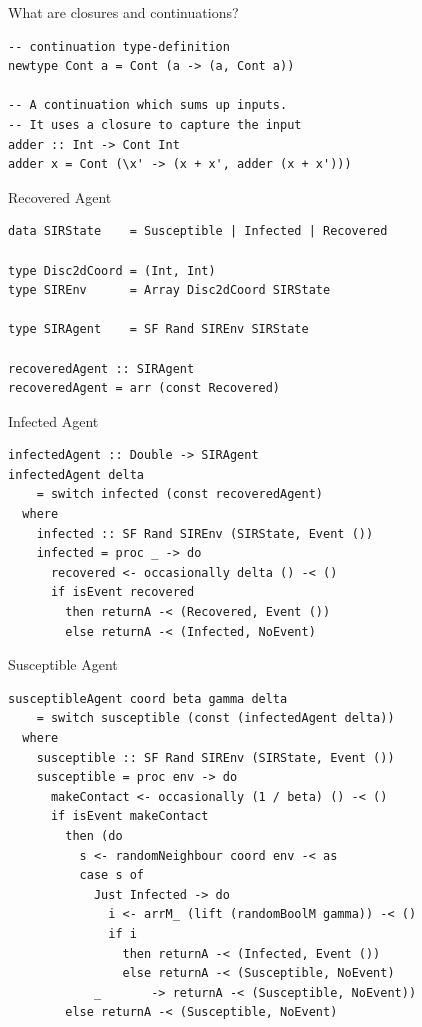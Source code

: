 \documentclass{beamer} %
\begin{document}
\begin{frame}[fragile]{What are closures and continuations?}
\begin{block}{}
\begin{verbatim}
-- continuation type-definition
newtype Cont a = Cont (a -> (a, Cont a))

-- A continuation which sums up inputs.
-- It uses a closure to capture the input
adder :: Int -> Cont Int
adder x = Cont (\x' -> (x + x', adder (x + x')))
\end{verbatim}
\end{block}
\end{frame}

\begin{frame}[fragile]{Recovered Agent}
\begin{block}{}
\begin{verbatim}
data SIRState    = Susceptible | Infected | Recovered

type Disc2dCoord = (Int, Int)
type SIREnv      = Array Disc2dCoord SIRState

type SIRAgent    = SF Rand SIREnv SIRState

recoveredAgent :: SIRAgent
recoveredAgent = arr (const Recovered) 
\end{verbatim}
\end{block}
\end{frame}

\begin{frame}[fragile]{Infected Agent}
\begin{block}{}
\begin{verbatim}
infectedAgent :: Double -> SIRAgent
infectedAgent delta
    = switch infected (const recoveredAgent)
  where
    infected :: SF Rand SIREnv (SIRState, Event ())
    infected = proc _ -> do
      recovered <- occasionally delta () -< ()
      if isEvent recovered
        then returnA -< (Recovered, Event ())
        else returnA -< (Infected, NoEvent)
\end{verbatim}
\end{block}
\end{frame}

\begin{frame}[fragile]{Susceptible Agent}
\begin{block}{}
\begin{verbatim}
susceptibleAgent coord beta gamma delta 
    = switch susceptible (const (infectedAgent delta))
  where
    susceptible :: SF Rand SIREnv (SIRState, Event ())
    susceptible = proc env -> do
      makeContact <- occasionally (1 / beta) () -< ()
      if isEvent makeContact
        then (do
          s <- randomNeighbour coord env -< as
          case s of
            Just Infected -> do
              i <- arrM_ (lift (randomBoolM gamma)) -< ()
              if i
                then returnA -< (Infected, Event ())
                else returnA -< (Susceptible, NoEvent)
            _       -> returnA -< (Susceptible, NoEvent))
        else returnA -< (Susceptible, NoEvent)
\end{verbatim}
\end{block}
\end{frame}
\end{document}
